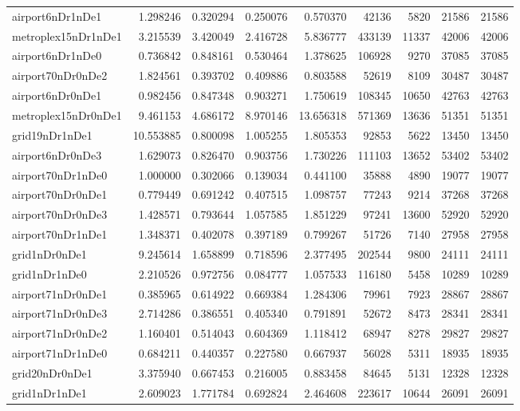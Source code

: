 \documentclass[../../../thesis.tex]{subfiles}
\begin{document}
\begin{longtable}{|l|r|r|r|r|r|r|r|r|}
airport6nDr1nDe1 & 1.298246 & 0.320294 & 0.250076 & 0.570370 & 42136 & 5820 & 21586 & 21586 \\
metroplex15nDr1nDe1 & 3.215539 & 3.420049 & 2.416728 & 5.836777 & 433139 & 11337 & 42006 & 42006 \\
airport6nDr1nDe0 & 0.736842 & 0.848161 & 0.530464 & 1.378625 & 106928 & 9270 & 37085 & 37085 \\
airport70nDr0nDe2 & 1.824561 & 0.393702 & 0.409886 & 0.803588 & 52619 & 8109 & 30487 & 30487 \\
airport6nDr0nDe1 & 0.982456 & 0.847348 & 0.903271 & 1.750619 & 108345 & 10650 & 42763 & 42763 \\
metroplex15nDr0nDe1 & 9.461153 & 4.686172 & 8.970146 & 13.656318 & 571369 & 13636 & 51351 & 51351 \\
grid19nDr1nDe1 & 10.553885 & 0.800098 & 1.005255 & 1.805353 & 92853 & 5622 & 13450 & 13450 \\
airport6nDr0nDe3 & 1.629073 & 0.826470 & 0.903756 & 1.730226 & 111103 & 13652 & 53402 & 53402 \\
airport70nDr1nDe0 & 1.000000 & 0.302066 & 0.139034 & 0.441100 & 35888 & 4890 & 19077 & 19077 \\
airport70nDr0nDe1 & 0.779449 & 0.691242 & 0.407515 & 1.098757 & 77243 & 9214 & 37268 & 37268 \\
airport70nDr0nDe3 & 1.428571 & 0.793644 & 1.057585 & 1.851229 & 97241 & 13600 & 52920 & 52920 \\
airport70nDr1nDe1 & 1.348371 & 0.402078 & 0.397189 & 0.799267 & 51726 & 7140 & 27958 & 27958 \\
grid1nDr0nDe1 & 9.245614 & 1.658899 & 0.718596 & 2.377495 & 202544 & 9800 & 24111 & 24111 \\
grid1nDr1nDe0 & 2.210526 & 0.972756 & 0.084777 & 1.057533 & 116180 & 5458 & 10289 & 10289 \\
airport71nDr0nDe1 & 0.385965 & 0.614922 & 0.669384 & 1.284306 & 79961 & 7923 & 28867 & 28867 \\
airport71nDr0nDe3 & 2.714286 & 0.386551 & 0.405340 & 0.791891 & 52672 & 8473 & 28341 & 28341 \\
airport71nDr0nDe2 & 1.160401 & 0.514043 & 0.604369 & 1.118412 & 68947 & 8278 & 29827 & 29827 \\
airport71nDr1nDe0 & 0.684211 & 0.440357 & 0.227580 & 0.667937 & 56028 & 5311 & 18935 & 18935 \\
grid20nDr0nDe1 & 3.375940 & 0.667453 & 0.216005 & 0.883458 & 84645 & 5131 & 12328 & 12328 \\
grid1nDr1nDe1 & 2.609023 & 1.771784 & 0.692824 & 2.464608 & 223617 & 10644 & 26091 & 26091 \\

\end{longtable}
\end{document}
